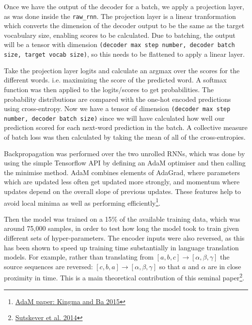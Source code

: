 \documentclass[]{article}
\begin{document}
Once we have the output of the decoder for a batch, we apply a projection layer, as was done inside the \lstinline{raw_rnn}. The projection layer is a linear tranformation which converts the dimension of the decoder output to be the same as the target vocabulary size, enabling scores to be calculated. Due to batching, the output will be a tensor with dimension \lstinline{(decoder max step number, decoder batch size, target vocab size)}, so this needs to be flattened to apply a linear layer.

Take the projection layer logits and calculate an argmax over the scores for the different words. i.e. maximizing the score of the predicted word. A softmax function was then applied to the logits/scores to get probabilities. The probability distributions are compared with the one-hot encoded predictions using cross-entropy. Now we have a tensor of dimension \lstinline{(decoder max step number, decoder batch size)} since we will have calculated how well our prediction scored for each next-word prediction in the batch. A collective measure of batch loss was then calculated by taking the mean of all of the cross-entropies.

Backpropagation was performed over the two unrolled RNNs, which was done by using the simple Tensorflow API by defining an AdaM optimiser and then calling the minimise method. AdaM combines elements of AdaGrad, where parameters which are updated less often get updated more strongly, and momentum where updates depend on the overall slope of previous updates. These features help to avoid local minima as well as performing efficiently\footnote{\href{https://arxiv.org/pdf/1412.6980v8.pdf}{AdaM paper:  Kingma and Ba 2015}}.
\iffalse
\texttt{[image: "C:/Users/mbcxrhm2/Dropbox/PhD/1st year/DrivenTLS/Images/alpha\_ph Dep/Populations/a0p01\_T6000".png]}
![seq2seq at training time](pictures/1-seq2seq.png)
\fi

Then the model was trained on a 15\% of the available training data, which was around 75,000 samples, in order to test how long the model took to train given different sets of hyper-parameters. The encoder inputs were also reversed, as this has been shown to speed up training time substantially in language translation models. For example, rather than translating from $[a, b, c] \to [\alpha, \beta, \gamma]$ the source sequences are reversed: $[c, b, a] \to [\alpha, \beta, \gamma]$ so that $a$ and $\alpha$ are in close proximity in time. This is a main theoretical contribution of this seminal paper\footnote{\href{https://papers.nips.cc/paper/5346-sequence-to-sequence-learning-with-neural-networks.pdf}{Sutskever et al. 2014}}.
\end{document}

